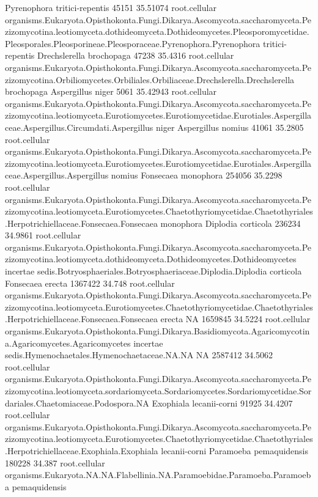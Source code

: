 \documentclass{article}
\begin{document}
\begin{Schunk}
\begin{Soutput}
 Pyrenophora tritici-repentis 		 45151 35.51074 	 root.cellular organisms.Eukaryota.Opisthokonta.Fungi.Dikarya.Ascomycota.saccharomyceta.Pezizomycotina.leotiomyceta.dothideomyceta.Dothideomycetes.Pleosporomycetidae.Pleosporales.Pleosporineae.Pleosporaceae.Pyrenophora.Pyrenophora tritici-repentis
 Drechslerella brochopaga 		 47238 35.4316 	 root.cellular organisms.Eukaryota.Opisthokonta.Fungi.Dikarya.Ascomycota.saccharomyceta.Pezizomycotina.Orbiliomycetes.Orbiliales.Orbiliaceae.Drechslerella.Drechslerella brochopaga
 Aspergillus niger 		 5061 35.42943 	 root.cellular organisms.Eukaryota.Opisthokonta.Fungi.Dikarya.Ascomycota.saccharomyceta.Pezizomycotina.leotiomyceta.Eurotiomycetes.Eurotiomycetidae.Eurotiales.Aspergillaceae.Aspergillus.Circumdati.Aspergillus niger
 Aspergillus nomius 		 41061 35.2805 	 root.cellular organisms.Eukaryota.Opisthokonta.Fungi.Dikarya.Ascomycota.saccharomyceta.Pezizomycotina.leotiomyceta.Eurotiomycetes.Eurotiomycetidae.Eurotiales.Aspergillaceae.Aspergillus.Aspergillus nomius
 Fonsecaea monophora 		 254056 35.2298 	 root.cellular organisms.Eukaryota.Opisthokonta.Fungi.Dikarya.Ascomycota.saccharomyceta.Pezizomycotina.leotiomyceta.Eurotiomycetes.Chaetothyriomycetidae.Chaetothyriales.Herpotrichiellaceae.Fonsecaea.Fonsecaea monophora
 Diplodia corticola 		 236234 34.9861 	 root.cellular organisms.Eukaryota.Opisthokonta.Fungi.Dikarya.Ascomycota.saccharomyceta.Pezizomycotina.leotiomyceta.dothideomyceta.Dothideomycetes.Dothideomycetes incertae sedis.Botryosphaeriales.Botryosphaeriaceae.Diplodia.Diplodia corticola
 Fonsecaea erecta 		 1367422 34.748 	 root.cellular organisms.Eukaryota.Opisthokonta.Fungi.Dikarya.Ascomycota.saccharomyceta.Pezizomycotina.leotiomyceta.Eurotiomycetes.Chaetothyriomycetidae.Chaetothyriales.Herpotrichiellaceae.Fonsecaea.Fonsecaea erecta
 NA 		 1659845 34.5224 	 root.cellular organisms.Eukaryota.Opisthokonta.Fungi.Dikarya.Basidiomycota.Agaricomycotina.Agaricomycetes.Agaricomycetes incertae sedis.Hymenochaetales.Hymenochaetaceae.NA.NA
 NA 		 2587412 34.5062 	 root.cellular organisms.Eukaryota.Opisthokonta.Fungi.Dikarya.Ascomycota.saccharomyceta.Pezizomycotina.leotiomyceta.sordariomyceta.Sordariomycetes.Sordariomycetidae.Sordariales.Chaetomiaceae.Podospora.NA
 Exophiala lecanii-corni 		 91925 34.4207 	 root.cellular organisms.Eukaryota.Opisthokonta.Fungi.Dikarya.Ascomycota.saccharomyceta.Pezizomycotina.leotiomyceta.Eurotiomycetes.Chaetothyriomycetidae.Chaetothyriales.Herpotrichiellaceae.Exophiala.Exophiala lecanii-corni
 Paramoeba pemaquidensis 		 180228 34.387 	 root.cellular organisms.Eukaryota.NA.NA.Flabellinia.NA.Paramoebidae.Paramoeba.Paramoeba pemaquidensis

\end{Soutput}
\end{Schunk}
\end{document}
